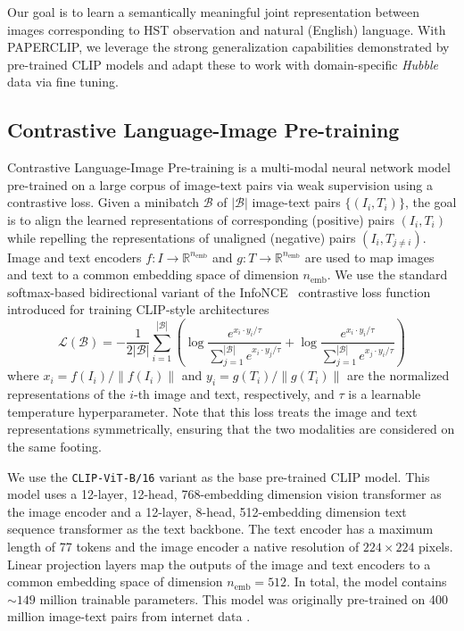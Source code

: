 \documentclass[10pt]{article} %
\newcommand{\hubble}{\emph{Hubble}\xspace}
\begin{document}
Our goal is to learn a semantically meaningful joint representation between images corresponding to HST observation and natural (English) language.
%
With PAPERCLIP, we leverage the strong generalization capabilities demonstrated by pre-trained CLIP models and adapt these to work with domain-specific \hubble data via fine tuning.

\subsection{Contrastive Language-Image Pre-training}

Contrastive Language-Image Pre-training \citep[CLIP;][]{radford2021learning} is a multi-modal neural network model pre-trained on a large corpus of image-text pairs via weak supervision using a contrastive loss.
%
Given a minibatch $\mathcal{B}$ of $|\mathcal{B}|$ image-text pairs $\{(I_i, T_i)\}$, the goal is to align the learned representations of corresponding (positive) pairs $(I_i, T_i)$ while repelling the representations of unaligned (negative) pairs $(I_i, T_{j\neq i})$.
%
Image and text encoders $f: I \rightarrow \mathbb R^{n_\text{emb}}$ and $g: T \rightarrow \mathbb R^{n_\text{emb}}$ are used to map images and text to a common embedding space of dimension $n_\text{emb}$.
%
We use the standard softmax-based bidirectional variant of the InfoNCE~\citep{oord2018representation} contrastive loss function introduced for training CLIP-style architectures \citep{radford2021learning}
%
\begin{equation}
  \label{eq:softmax_loss}
  \mathcal{L}(\mathcal{B})=-\frac{1}{2|\mathcal{B}|} \sum_{i=1}^{|\mathcal{B}|}\left(\log \frac{e^{x_i \cdot y_i / \tau}}{\sum_{j=1}^{|\mathcal{B}|} e^{x_i \cdot y_j / \tau}}+\log \frac{e^{x_i \cdot y_i / \tau}}{\sum_{j=1}^{|\mathcal{B}|} e^{x_j \cdot y_i / \tau}}\right)
\end{equation}
%
where ${x}_i={f\left(I_i\right)}/{\left\|f\left(I_i\right)\right\|}$ and ${y}_i={g\left(T_i\right)}/{\left\|g\left(T_i\right)\right\|}$ are the normalized representations of the $i$-th image and text, respectively, and $\tau$ is a learnable temperature hyperparameter.
%
Note that this loss treats the image and text representations symmetrically, ensuring that the two modalities are considered on the same footing.

We use the \texttt{CLIP-ViT-B/16} \citep{radford2021learning} variant as the base pre-trained CLIP model.
%
This model uses a 12-layer, 12-head, 768-embedding dimension vision transformer as the image encoder and a 12-layer, 8-head, 512-embedding dimension text sequence transformer as the text backbone.
%
The text encoder has a maximum length of 77 tokens and the image encoder a native resolution of $224\times224$ pixels.
%
Linear projection layers map the outputs of the image and text encoders to a common embedding space of dimension $n_\text{emb}=512$.
%
In total, the model contains $\sim 149$ million trainable parameters.
%
This model was originally pre-trained on 400 million image-text pairs from internet data \citep{radford2021learning}.
%
\end{document}
